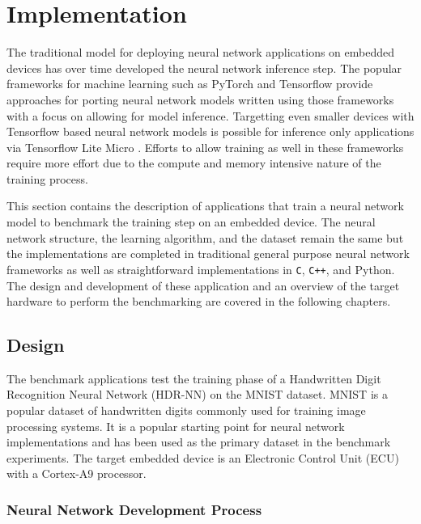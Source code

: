 \part{Implementation}

The traditional model for deploying neural network applications on embedded devices has over time developed the neural network inference step. The popular frameworks for machine learning such as PyTorch and Tensorflow provide approaches for porting neural network models written using those frameworks with a focus on allowing for model inference. Targetting even smaller devices with Tensorflow based neural network models is possible for inference only applications via Tensorflow Lite Micro \cite{tflm}. Efforts to allow training as well in these frameworks require more effort due to the compute and memory intensive nature of the training process.

This section contains the description of applications that train a neural network model to benchmark the training step on an embedded device. The neural network structure, the learning algorithm, and the dataset remain the same but the implementations are completed in traditional general purpose neural network frameworks as well as straightforward implementations in \texttt{C}, \texttt{C++}, and Python. The design and development of these application and an overview of the target hardware to perform the benchmarking are covered in the following chapters.


\chapter{Design}

The benchmark applications test the training phase of a Handwritten Digit Recognition Neural Network (HDR-NN) on the MNIST \cite{mnist} dataset. MNIST is a popular dataset of handwritten digits commonly used for training image processing systems. It is a popular starting point for neural network implementations and has been used as the primary dataset in the benchmark experiments. The target embedded device is an Electronic Control Unit (ECU) with a Cortex-A9 processor.

\section{Neural Network Development Process}

